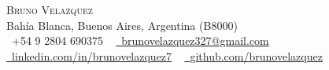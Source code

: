 \documentclass[a4paper,11pt]{article}
\begin{document}
\begin{center}
    {\Huge \scshape Bruno Velazquez} \\ \vspace{1pt}
    Bahía Blanca, Buenos Aires, Argentina (B8000) \\ \vspace{1pt}
    \footnotesize \raisebox{-0.1\height}\faPhone\ +54 9 2804 690375 ~
    \href{mailto:brunovelazquez327@gmail.com}{\raisebox{-0.2\height}\faEnvelope\ \underline{brunovelazquez327@gmail.com}} ~
    \href{https://linkedin.com/in/brunovelazquez7/}{\raisebox{-0.2\height}\faLinkedin\ \underline{linkedin.com/in/brunovelazquez7}} ~
    \href{https://github.com/brunovelazquez}{\raisebox{-0.2\height}\faGithub\ \underline{github.com/brunovelazquez}}
    \vspace{-8pt}
\end{center}


  

  

  

  

  

  


  

  
\end{document}
